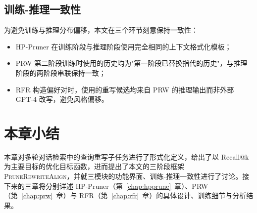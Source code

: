 \subsection{训练-推理一致性}

为避免训练与推理分布偏移，本文在三个环节刻意保持一致性：

\begin{itemize}
    \item HP-Pruner 在训练阶段与推理阶段使用完全相同的上下文格式化模板；
    \item PRW 第二阶段训练时使用的历史均为"第一阶段已替换指代的历史"，与推理阶段的两阶段串联保持一致；
    \item RFR 构造偏好对时，使用的重写候选均来自 PRW 的推理输出而非外部 GPT-4 改写，避免风格偏移。
\end{itemize}

\section{本章小结}

本章对多轮对话检索中的查询重写子任务进行了形式化定义，给出了以 Recall@k 为主要目标的优化目标函数，进而提出了本文的三阶段框架 \textsc{PruneRewriteAlign}，并就三模块的功能界面、训练-推理一致性进行了讨论。接下来的三章将分别详述 HP-Pruner（第~\ref{chap:hpprune}~章）、PRW（第~\ref{chap:prw}~章）与 RFR（第~\ref{chap:rfr}~章）的具体设计、训练细节与分析结果。
